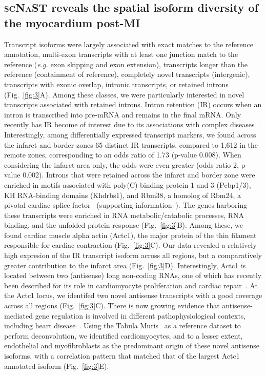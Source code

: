 \documentclass[utf8]{FrontiersinHarvard} %
\newcommand{\eg}{\textit{e.g.}\xspace}
\newcommand{\scnast}{\textsc{scNaST}\xspace}
\begin{document}
\subsection*{\scnast reveals the spatial isoform diversity of the myocardium post-MI}
Transcript isoforms were largely associated with exact matches to the reference annotation, multi-exon transcripts with at least one junction match to the reference (\eg exon skipping and exon extension), transcripts longer than the reference (containment of reference), completely novel transcripts (intergenic), transcripts with exonic overlap, intronic transcripts, or retained introns (Fig.~\ref{fig:3}A). 
Among these classes, we were particularly interested in novel transcripts associated with retained introns. Intron retention (IR) occurs when an intron is transcribed into pre-mRNA and remains in the final mRNA. Only recently has IR become of interest due to its associations with complex diseases~\citep{Zhang2020:IR_cancer}.
Interestingly, among differentially expressed transcript markers, we found across the infarct and border zones 65 distinct IR transcripts, compared to 1,612 in the remote zones, corresponding to an odds ratio of 1.73 (p-value 0.008). When considering the infarct area only, the odds were even greater (odds ratio 2, p-value 0.002).
Introns that were retained across the infarct and border zone were enriched in motifs associated with poly(C)-binding protein 1 and 3 (Pcbp1/3), KH RNA-binding domains (Khdrbs1), and Rbm38, a homolog of Rbm24, a pivotal cardiac splice factor~\citep{Weeland2015:AS_heart} (supporting information~).
The genes harboring these transcripts were enriched in RNA metabolic/catabolic processes, RNA binding, and the unfolded protein response (Fig.~\ref{fig:3}B).
Among these, we found cardiac muscle alpha actin (Actc1), the major protein of the thin filament responsible for cardiac contraction (Fig.~\ref{fig:3}C). 
Our data revealed a relatively high expresion of the IR transcript isoform across all regions, but a comparatively greater contribution to the infarct area (Fig.~\ref{fig:3}D).
Interestingly, Actc1 is located between two (antisense) long non-coding RNAs, one of which has recently been described for its role in cardiomyocyte proliferation and cardiac repair~\citep{Murugavel2019:lncPCR}.
At the Actc1 locus, we identifed two novel antisense transcripts with a good coverage across all regions (Fig.~\ref{fig:3}C).
There is now growing evidence that antisense-mediated gene regulation is involved in different pathophysiological contexts, including heart disease~\citep{Luther2005:antisense_cardiac,Zinad2017:NATs,Celik2019:Nppa-AS}.
Using the Tabula Muris~\citep{Schaum2018:Tabula_muris} as a reference dataset to perform deconvolution, we identified cardiomyocytes, and to a lesser extent, endothelial and myofibroblasts as the predominant origin of these novel antisense isoforms, with a correlation pattern that matched that of the largest Actc1 annotated isoform (Fig.~\ref{fig:3}E).
\end{document}
